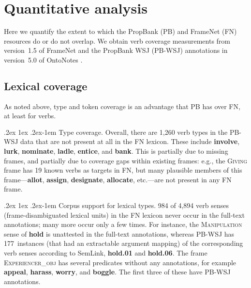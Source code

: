 \documentclass[11pt]{article}
\makeatletter
\newcommand{\ensuretext}[1]{#1}
\newcommand{\nssmarker}{\ensuretext{\textcolor{magenta}{\ensuremath{^{\textsc{NS}}_{\textsc{S}}}}}}
\newcommand{\arkcomment}[3]{\ensuretext{\textcolor{#3}{[#1 #2]}}}
\newcommand{\nss}[1]{\arkcomment{\nssmarker}{#1}{magenta}}
\renewcommand{\paragraph}{%
  \@startsection{paragraph}{4}%
  {\z@}{.2ex \@plus 1ex \@minus .2ex}{-1em}%
  {\normalfont\normalsize\bfseries}%
}
\newcommand{\finalversion}[1]{}
\newcommand{\vpred}[1]{\textbf{#1}} %
\newcommand{\fname}[1]{\textsc{#1}} %
\makeatother
\begin{document}
\section{Quantitative analysis}\label{sec:quant}

Here we quantify the extent to which the PropBank (PB) and FrameNet (FN) resources 
do or do not overlap. We obtain verb coverage measurements from version~1.5 of FrameNet 
and the PropBank WSJ (PB-WSJ) annotations in version~5.0 of OntoNotes \citep{ontonotes}. 

\subsection{Lexical coverage}\label{sec:coverage}


As noted above, type and token coverage is an advantage that PB has over FN, at least for verbs.

\paragraph{Type coverage.}
Overall, there are 1,260 verb types in the PB-WSJ data that are not present at all in the FN lexicon. 
These include \vpred{involve}, \vpred{lurk}, \vpred{nominate}, \vpred{ladle}, \vpred{entice}, and \vpred{bank}.
This is partially due to missing frames, and partially due to coverage gaps within existing frames:
e.g., the \fname{Giving} frame has 19 known verbs as targets in FN, but  
many plausible members of this frame---\vpred{allot}, \vpred{assign}, \vpred{designate}, \vpred{allocate}, etc.---are not present in any FN frame. 

\paragraph{Corpus support for lexical types.} 984 of 4,894 verb senses (frame-disambiguated lexical units) in the FN lexicon 
never occur in the full-text annotations; many more occur only a few times.\finalversion{\nss{how many verb *types* occur at least once in PB?}}
For instance, the \fname{Manipulation} sense of \vpred{hold} is unattested in the full-text annotations,
whereas PB-WSJ has 177~instances (that had an extractable argument mapping) of the corresponding 
verb senses according to SemLink, \vpred{hold.01} and \vpred{hold.06}.
The frame \fname{Experiencer\_obj} has several predicates without any annotations, 
for example \vpred{appeal}, \vpred{harass}, \vpred{worry}, and \vpred{boggle}. 
The first three of these have PB-WSJ annotations. 
\end{document}

